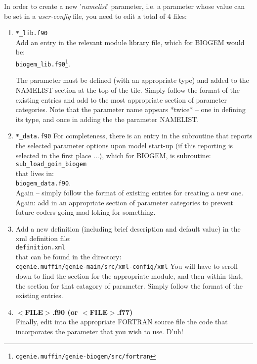 \documentclass[11pt,fleqn]{book} %
\begin{document}
In order to create a new '\textit{namelist}' parameter, i.e. a parameter whose value can be set in a \textit{user-config} file, you need to edit a total of 4 files:
\begin{enumerate}
         
        \item \texttt{*\_lib.f90}
        \\Add an entry in the relevant module library file, which for BIOGEM would be:
        \\\texttt{biogem\_lib.f90}\footnote{\texttt{cgenie.muffin/genie-biogem/src/fortran}}.

        The parameter must be defined (with an appropriate type) and added to the NAMELIST section at the top of the tile. Simply follow the format of the existing entries and add to the most appropriate section of parameter categories.
        Note that the parameter name appears *twice* -- one in defining its type, and once in adding the the parameter NAMELIST.
        
        \item \texttt{*\_data.f90}
        For completeness, there is an entry in the subroutine that reports the selected parameter options upon model start-up (if this reporting is selected in the first place ...), which for BIOGEM, is subroutine:
        \\\texttt{sub\_load\_goin\_biogem}
        \\that lives in:
        \\\texttt{biogem\_data.f90}.\\Again -- simply follow the format of existing entries for creating a new one.        Again: add in an appropriate section of parameter categories to prevent future coders going mad loking for something.
        
        \item Add a new definition (including brief description and default value) in the xml definition file:
        \\\texttt{definition.xml}
        \\that can be found in the directory:
        \\\texttt{cgenie.muffin/genie-main/src/xml-config/xml}
        You will have to scroll down to find the section for the appropriate module, and then within that, the section for that catagory of parameter.
        Simply follow the format of the existing entries.
        
        \item \textbf{$<$FILE$>$.f90 (or $<$FILE$>$.f77)}
        \\Finally, edit into the appropriate FORTRAN source file the code that incorporates the parameter that you wish to use.
        D'uh!
               
\end{enumerate}
\end{document}
